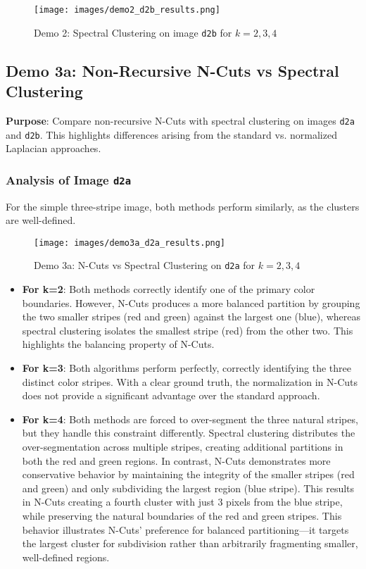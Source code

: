 \documentclass[12pt,a4paper]{article}
\begin{document}
{\begin{figure}[H]
    \centering
    \texttt{[image: images/demo2\_d2b\_results.png]}
    \caption{Demo 2: Spectral Clustering on image \texttt{d2b} for $k=2,3,4$}
    \label{fig:demo2_d2b_results}
\end{figure}



\subsection{Demo 3a: Non-Recursive N-Cuts vs Spectral Clustering}
\textbf{Purpose}: Compare non-recursive N-Cuts with spectral clustering on images \texttt{d2a} and \texttt{d2b}. This highlights differences arising from the standard vs. normalized Laplacian approaches.

\subsubsection{Analysis of Image \texttt{d2a}}

For the simple three-stripe image, both methods perform similarly, as the clusters are well-defined.

\begin{figure}[H]
    \centering
    \texttt{[image: images/demo3a\_d2a\_results.png]}
    \caption{Demo 3a: N-Cuts vs Spectral Clustering on \texttt{d2a} for $k=2,3,4$}
    \label{fig:demo3a_d2a_results}
\end{figure}

\begin{itemize}

    \item \textbf{For k=2}: Both methods correctly identify one of the primary color boundaries. However, N-Cuts produces a more balanced partition by grouping the two smaller stripes (red and green) against the largest one (blue), whereas spectral clustering isolates the smallest stripe (red) from the other two. This highlights the balancing property of N-Cuts.
    \item \textbf{For k=3}: Both algorithms perform perfectly, correctly identifying the three distinct color stripes. With a clear ground truth, the normalization in N-Cuts does not provide a significant advantage over the standard approach.
    \item \textbf{For k=4}: Both methods are forced to over-segment the three natural stripes, but they handle this constraint differently. Spectral clustering distributes the over-segmentation across multiple stripes, creating additional partitions in both the red and green regions. In contrast, N-Cuts demonstrates more conservative behavior by maintaining the integrity of the smaller stripes (red and green) and only subdividing the largest region (blue stripe). This results in N-Cuts creating a fourth cluster with just 3 pixels from the blue stripe, while preserving the natural boundaries of the red and green stripes. This behavior illustrates N-Cuts' preference for balanced partitioning—it targets the largest cluster for subdivision rather than arbitrarily fragmenting smaller, well-defined regions.
\end{itemize}


}
\end{document}
